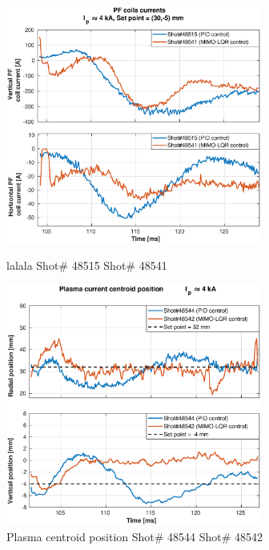 \begin{figure}
	\centering
	\includegraphics[width=0.75\textwidth]{Chp5/PIDvsMIMO_515_541_curr_2.eps}
	\label{564_559curr}
	\caption{lalala   Shot\# 48515 Shot\# 48541}
\end{figure}

\begin{figure}
	\centering
	\includegraphics[width=0.75\textwidth]{Chp5/PIDvsMIMO_544_542_2.eps}
	\caption{Plasma centroid position  Shot\# 48544 Shot\# 48542}
\end{figure}

